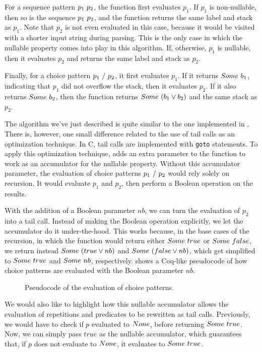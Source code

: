 For a sequence pattern $p_1\ p_2$,
the function first evaluates $p_1$.
If $p_1$ is non-nullable,
then so is the sequence $p_1\ p_2$,
and the function returns the same label and stack as $p_1$.
Note that $p_2$ is not even evaluated in this case,
because it would be visited with a shorter input string
during parsing.
This is the only case in which
the nullable property comes into play
in this algorithm.
If, otherwise, $p_1$ is nullable,
then it evaluates $p_2$
and returns the same label and stack as $p_2$.

Finally, for a choice pattern $p_1\ /\ p_2$,
it first evaluates $p_1$.
If it returns $Some\ b_1$,
indicating that $p_1$ did not overflow the stack,
then it evaluates $p_2$.
If it also returns $Some\ b_2$,
then the function returns $Some\ (b_1 \vee b_2)$
and the same stack as $p_2$.

The algorithm we've just described
is quite similar to the one implemented in \lpeg{}.
There is, however, one small difference
related to the use of tail calls
as an optimization technique.
In C, tail calls are implemented
with \texttt{goto} statements.
To apply this optimization technique,
\lpeg{} adds an extra parameter to the function
to work as an accumulator for the nullable property.
Without this accumulator parameter,
the evaluation of choice patterns $p_1\ /\ p_2$
would rely solely on recursion.
It would evaluate $p_1$ and $p_2$,
then perform a Boolean \scor{} operation on the results.

With the addition of a Boolean parameter $nb$,
we can turn the evaluation of $p_2$ into a tail call.
Instead of making the Boolean \scor{} operation explicitly,
we let the accumulator do it under-the-hood.
This works because,
in the base cases of the recursion,
in which the function would return
either $Some\ true$ or $Some\ false$,
we return instead $Some\ (true \vee nb)$ and $Some\ (false \vee nb)$,
which get simplified to $Some\ true$ and $Some\ nb$, respectively.
 shows a Coq-like pseudocode of how choice patterns
are evaluated with the Boolean parameter $nb$.

\begin{figure}
    \centering
    
    \caption{Pseudocode of the evaluation of choice patterns.}
    \label{fig:evalchoice}
\end{figure}

We would also like to highlight
how this nullable accumulator allows
the evaluation of repetitions and predicates
to be rewritten as tail calls.
Previously,
we would have to check if $p$ evaluated to $None$,
before returning $Some\ true$.
Now, we can simply pass $true$ as the nullable accumulator,
which guarantees that, if $p$ does not evaluate to $None$,
it evaluates to $Some\ true$.


